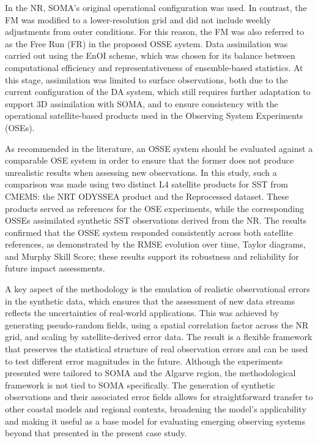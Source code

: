 In the NR, SOMA's original operational configuration was used. In contrast, the FM was modified to a lower-resolution grid and did not include weekly adjustments from outer conditions. For this reason, the FM was also referred to as the Free Run (FR) in the proposed OSSE system. Data assimilation was carried out using the EnOI scheme, which was chosen for its balance between computational efficiency and representativeness of ensemble-based statistics. At this stage, assimilation was limited to surface observations, both due to the current configuration of the DA system, which still requires further adaptation to support 3D assimilation with SOMA, and to ensure consistency with the operational satellite-based products used in the Observing System Experiments (OSEs).

As recommended in the literature, an OSSE system should be evaluated against a comparable OSE system in order to ensure that the former does not produce unrealistic results when assessing new observations. In this study, such a comparison was made using two distinct L4 satellite products for SST from CMEMS: the NRT ODYSSEA product and the Reprocessed dataset. These products served as references for the OSE experiments, while the corresponding OSSEs assimilated synthetic SST observations derived from the NR. The results confirmed that the OSSE system responded consistently across both satellite references, as demonstrated by the RMSE evolution over time, Taylor diagrams, and Murphy Skill Score; these results support its robustness and reliability for future impact assessments.

A key aspect of the methodology is the emulation of realistic observational errors in the synthetic data, which ensures that the assessment of new data streams reflects the uncertainties of real-world applications. This was achieved by generating pseudo-random fields, using a spatial correlation factor across the NR grid, and scaling by satellite-derived error data. The result is a flexible framework that preserves the statistical structure of real observation errors and can be used to test different error magnitudes in the future. Although the experiments presented were tailored to SOMA and the Algarve region, the methodological framework is not tied to SOMA specifically. The generation of synthetic observations and their associated error fields allows for straightforward transfer to other coastal models and regional contexts, broadening the model's applicability and making it useful as a base model for evaluating emerging observing systems beyond that presented in the present case study. 

